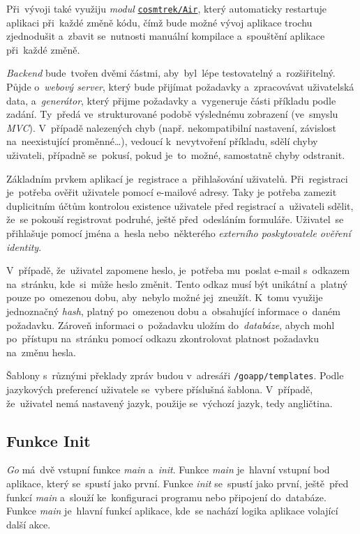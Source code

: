 \documentclass[11pt,a4paper]{report}
\begin{document}
            Při~vývoji také využiju \emph{modul} \href{https://github.com/cosmtrek/air}{\texttt{cosmtrek/Air}}, který automaticky restartuje aplikaci při~každé změně kódu, čímž bude možné vývoj aplikace trochu zjednodušit a~zbavit se~nutnosti manuální kompilace a~spouštění aplikace při~každé změně.

            \emph{Backend} bude~tvořen dvěmi částmi, aby~byl~lépe testovatelný a~rozšiřitelný. Půjde o~\emph{webový server}, který bude přijímat požadavky a~zpracovávat uživatelská data, a~\emph{generátor}, který přijme požadavky a~vygeneruje části příkladu podle zadání. Ty~předá ve~strukturované podobě výslednému zobrazení (ve~smyslu \emph{MVC}). V~případě nalezených chyb (např. nekompatibilní nastavení, závislost na~neexistující proměnné\dots), vedoucí k~nevytvoření příkladu, sdělí chyby uživateli, případně se~pokusí, pokud je~to~možné, samostatně chyby odstranit.

            Základním prvkem aplikací je~registrace a~přihlašování uživatelů. Při~registraci je~potřeba ověřit uživatele pomocí e-mailové adresy. Taky je potřeba zamezit duplicitním účtům kontrolou existence uživatele před registrací a~uživateli sdělit, že~se pokouší registrovat podruhé, ještě před~odesláním formuláře. Uživatel~se přihlašuje pomocí jména a~hesla nebo~některého \emph{externího poskytovatele ověření identity}.
            
            V~případě, že~uživatel zapomene heslo, je~potřeba mu~poslat e-mail s~odkazem na~stránku, kde~si~může heslo změnit. Tento odkaz musí být unikátní a~platný pouze po~omezenou dobu, aby~nebylo možné jej~zneužít. K~tomu využije jednoznačný \emph{hash}, platný po~omezenou dobu a~obsahující informace o~daném požadavku. Zároveň informaci o~požadavku uložím do~\emph{databáze}, abych mohl po~přístupu na~stránku pomocí odkazu zkontrolovat platnost požadavku na~změnu hesla.

            Šablony s~různými překlady zpráv budou v~adresáři \texttt{/goapp/templates}. Podle jazykových preferencí uživatele se~vybere příslušná šablona. V~případě, že~uživatel nemá nastavený jazyk, použije se~výchozí jazyk, tedy angličtina.
            
        \subsection{Funkce Init}
            \emph{Go} má~dvě vstupní funkce \emph{main} a~\emph{init}. Funkce \emph{main} je~hlavní vstupní bod aplikace, který se~spustí jako první. Funkce \emph{init} se~spustí jako první, ještě~před funkcí \emph{main} a~slouží ke~konfiguraci programu nebo připojení do~databáze. Funkce \emph{main} je~hlavní funkcí aplikace, kde~se nachází logika aplikace volající další akce.
\end{document}
